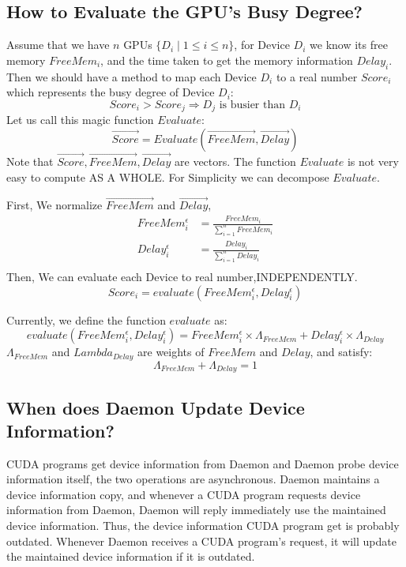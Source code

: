 \documentclass[a4paper,11pt]{article}
\begin{document}
\subsection{How to Evaluate the GPU's Busy Degree?}
Assume that we have $n$ GPUs $\{D_i \mid 1 \le i \le n \}$,
for Device $D_i$ we  know its free memory $FreeMem_i$, and the time taken to get the memory information $Delay_i$.
Then we should have a method to map each Device $D_i$ to a real number $Score_i$ which represents the busy degree
of Device $D_i$:
   \[ Score_i > Score_j \Rightarrow D_j \textrm{ is busier than } D_i \]
Let us call this magic function $Evaluate$:
   \[ \overrightarrow{Score} = Evaluate(\overrightarrow{FreeMem}, \overrightarrow{Delay}) \]
Note that $\overrightarrow{Score}, \overrightarrow{FreeMem}, \overrightarrow{Delay}$ are vectors. The function $Evaluate$ is not very easy to compute AS
A WHOLE.
For Simplicity we can decompose $Evaluate$.

First, We normalize $\overrightarrow{FreeMem}$ and $\overrightarrow{Delay}$,
\[ \begin{array}{rl}
  \displaystyle FreeMem_i^{\epsilon} &= \frac{FreeMem_i}{\sum_{i=1}^n FreeMem_i} \\
  \displaystyle Delay_i^{\epsilon} &= \frac{Delay_i}{\sum_{i=1}^n Delay_i} \\
  \end{array} \]
Then, We can evaluate each Device to real number,INDEPENDENTLY.
\[ Score_i = evaluate(FreeMem_i^{\epsilon}, Delay_i^{\epsilon})\]

Currently, we define the function $evaluate$ as:
\[ evaluate(FreeMem_i^{\epsilon}, Delay_i^{\epsilon}) = FreeMem_i^{\epsilon} \times \Lambda_{FreeMem} + Delay_i^{\epsilon} \times \Lambda_{Delay} \]
$\Lambda_{FreeMem}$ and $Lambda_{Delay}$ are weights of $FreeMem$ and $Delay$, and satisfy:
\[\Lambda_{FreeMem} + \Lambda_{Delay} = 1 \]

\subsection{When does Daemon Update Device Information?}
CUDA programs get device information from Daemon and Daemon probe device
information itself, the two operations are asynchronous.  Daemon maintains a
device information copy, and whenever a CUDA program requests device information
from Daemon, Daemon will reply immediately use the maintained device
information. Thus, the device information CUDA program get is probably outdated.
Whenever Daemon receives a CUDA program's request, it will update the maintained device information if it is outdated.
\end{document}
